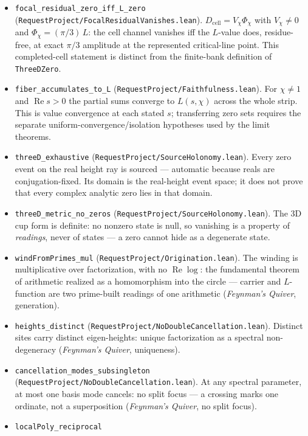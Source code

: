 \documentclass[11pt]{article}
\theoremstyle{definition}
\renewcommand{\Re}{\operatorname{Re}}
\begin{document}
\begin{itemize}
trace equals the explicit-formula sum of log-derivative residues: the trace
formulas coincide, not just the locations.
\item \texttt{focal\_residual\_zero\_iff\_L\_zero}
(\texttt{RequestProject/FocalResidualVanishes.lean}).
\(D_{\mathrm{cell}}=V_\chi\Phi_\chi\) with \(V_\chi\neq0\) and
\(\Phi_\chi=(\pi/3)\,L\): the cell channel vanishes iff the \(L\)-value
does, residue-free, at exact \(\pi/3\) amplitude at the represented
critical-line point.  This completed-cell statement is distinct from the
finite-bank definition of \texttt{ThreeDZero}.
\item \texttt{fiber\_accumulates\_to\_L}
(\texttt{RequestProject/Faithfulness.lean}). For \(\chi\neq1\) and
\(\Re s>0\) the partial sums converge to \(L(s,\chi)\) across the whole
strip.  This is value convergence at each stated \(s\); transferring zero
sets requires the separate uniform-convergence/isolation hypotheses used by
the limit theorems.
\item \texttt{threeD\_exhaustive}
(\texttt{RequestProject/SourceHolonomy.lean}). Every zero event on the real
height ray is sourced --- automatic because reals are conjugation-fixed.  Its
domain is the real-height event space; it does not prove that every complex
analytic zero lies in that domain.
\item \texttt{threeD\_metric\_no\_zeros}
(\texttt{RequestProject/SourceHolonomy.lean}). The 3D cup form is definite:
no nonzero state is null, so vanishing is a property of \emph{readings},
never of states --- a zero cannot hide as a degenerate state.
\item \texttt{windFromPrimes\_mul}
(\texttt{RequestProject/Origination.lean}). The winding is multiplicative
over factorization, with no \(\Re\!\log\): the fundamental theorem of
arithmetic realized as a homomorphism into the circle --- carrier and
\(L\)-function are two prime-built readings of one arithmetic (\emph{Feynman's Quiver},
generation).
\item \texttt{heights\_distinct}
(\texttt{RequestProject/NoDoubleCancellation.lean}). Distinct sites carry
distinct eigen-heights: unique factorization as a spectral
non-degeneracy (\emph{Feynman's Quiver}, uniqueness).
\item \texttt{cancellation\_modes\_subsingleton}
(\texttt{RequestProject/NoDoubleCancellation.lean}). At any spectral
parameter, at most one basis mode cancels: no split focus --- a crossing
marks one ordinate, not a superposition (\emph{Feynman's Quiver}, no split focus).
\item \texttt{localPoly\_reciprocal}

\end{itemize}
\end{document}
